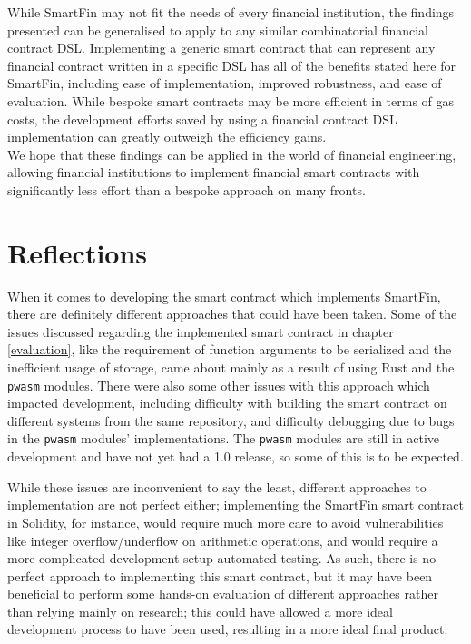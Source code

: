 While SmartFin may not fit the needs of every financial institution, the findings presented can be generalised to apply to any similar combinatorial financial contract DSL. Implementing a generic smart contract that can represent any financial contract written in a specific DSL has all of the benefits stated here for SmartFin, including ease of implementation, improved robustness, and ease of evaluation. While bespoke smart contracts may be more efficient in terms of gas costs, the development efforts saved by using a financial contract DSL implementation can greatly outweigh the efficiency gains. \\

We hope that these findings can be applied in the world of financial engineering, allowing financial institutions to implement financial smart contracts with significantly less effort than a bespoke approach on many fronts.


\section{Reflections}

When it comes to developing the smart contract which implements SmartFin, there are definitely different approaches that could have been taken. Some of the issues discussed regarding the implemented smart contract in chapter \ref{evaluation}, like the requirement of function arguments to be serialized and the inefficient usage of storage, came about mainly as a result of using Rust and the \texttt{pwasm} modules. There were also some other issues with this approach which impacted development, including difficulty with building the smart contract on different systems from the same repository, and difficulty debugging due to bugs in the \texttt{pwasm} modules' implementations. The \texttt{pwasm} modules are still in active development and have not yet had a 1.0 release, so some of this is to be expected.

While these issues are inconvenient to say the least, different approaches to implementation are not perfect either; implementing the SmartFin smart contract in Solidity, for instance, would require much more care to avoid vulnerabilities like integer overflow/underflow on arithmetic operations, and would require a more complicated development setup automated testing. As such, there is no perfect approach to implementing this smart contract, but it may have been beneficial to perform some hands-on evaluation of different approaches rather than relying mainly on research; this could have allowed a more ideal development process to have been used, resulting in a more ideal final product. \\

